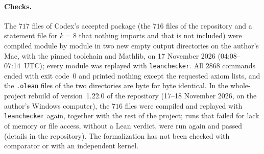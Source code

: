 \documentclass[11pt]{article}
\theoremstyle{remark}
\begin{document}
\paragraph{Checks.}
The $717$ files of Codex's accepted package (the $716$ files of the repository
and a statement file for $k=8$ that nothing imports and that is not included)
were compiled module by module in two new empty output directories on the
author's Mac, with the pinned toolchain and Mathlib, on 17 November 2026
(04:08--07:14~UTC); every module was replayed with \texttt{leanchecker}. All
$2868$ commands ended with exit code~$0$ and printed nothing except the
requested axiom lists, and the \texttt{.olean} files of the two directories are
byte for byte identical. In the whole-project rebuild of version~1.22.0 of the repository (17--18 November 2026, on the author's Windows computer), the $716$ files were compiled and replayed with \texttt{leanchecker} again, together with the rest of the project; runs that failed for lack of memory or file access, without a Lean verdict, were run again and passed (details in the repository). The formalization has not been checked
with comparator or with an independent kernel.
\end{document}
